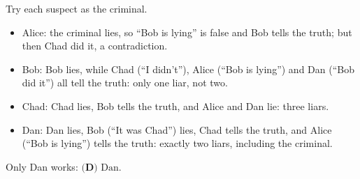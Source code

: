 Try each suspect as the criminal.
\begin{itemize}
\item Alice: the criminal lies, so ``Bob is lying'' is false and Bob tells the truth; but then Chad did it, a contradiction.
\item Bob: Bob lies, while Chad (``I didn't''), Alice (``Bob is lying'') and Dan (``Bob did it'') all tell the truth: only one liar, not two.
\item Chad: Chad lies, Bob tells the truth, and Alice and Dan lie: three liars.
\item Dan: Dan lies, Bob (``It was Chad'') lies, Chad tells the truth, and Alice (``Bob is lying'') tells the truth: exactly two liars, including the criminal.
\end{itemize}
Only Dan works: $\boxed{\textbf{(D) }\text{Dan}}$.
